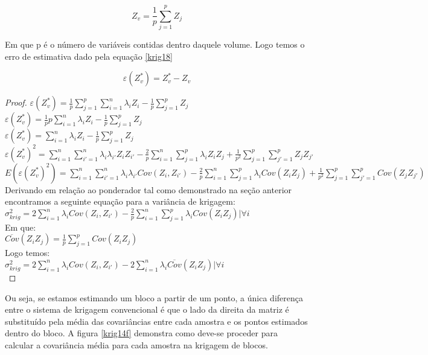 \begin{equation}\label{krig17}
Z_{v}  = \frac{1}{p}\sum_{j=1}^{p} Z_{j}
\end{equation}

Em que p é o número de variáveis contidas dentro daquele volume. Logo temos o erro de estimativa dado pela equação \eqref{krig18}

\begin{equation}\label{krig18}
\varepsilon (Z^{*}_{v}) = Z^{*} _{v} - Z_{v}
\end{equation}

\begin{proof}
	$\varepsilon (Z^{*}_{v}) = \frac{1}{p}\sum_{j=1}^{p}\sum_{i=1}^{n}\lambda_{i}Z_{i} - \frac{1}{p}\sum_{j=1}^{p} Z_{j} $ \\
	$\varepsilon (Z^{*}_{v}) = \frac{1}{p}p\sum_{i=1}^{n}\lambda_{i}Z_{i} - \frac{1}{p}\sum_{j=1}^{p} Z_{j} $\\	
	$\varepsilon (Z^{*}_{v}) = \sum_{i=1}^{n}\lambda_{i}Z_{i} - \frac{1}{p}\sum_{j=1}^{p} Z_{j} $\\	
	$\varepsilon (Z^{*}_{v})^2 = \sum_{i=1}^{n}\sum_{i'=1}^{n}\lambda_{i}\lambda_{i'}Z_{i}Z_{i'} - \frac{2}{p}\sum_{i=1}^{n}\sum_{j=1}^{p}\lambda_{i}Z_{i}Z_{j}+ \frac{1}{p^2}\sum_{j=1}^{p}\sum_{j'=1}^{p} Z_{j}Z_{j'} $\\
	$E\left(\varepsilon (Z^{*}_{v})^2 \right) = \sum_{i=1}^{n}\sum_{i'=1}^{n}\lambda_{i}\lambda_{i'}Cov(Z_{i},Z_{i'}) - \frac{2}{p}\sum_{i=1}^{n}\sum_{j=1}^{p}\lambda_{i}Cov(Z_{i}Z_{j})+ \frac{1}{p^2}\sum_{j=1}^{p}\sum_{j'=1}^{p} Cov(Z_{j}Z_{j'}) $\\   
     Derivando em relação ao ponderador tal como demonstrado na seção anterior encontramos a seguinte equação para a variância de krigagem:    \\
     $\sigma^{2}_{krig} = 2\sum_{i=1}^{n}\lambda_{i}Cov(Z_{i},Z_{i'}) - \frac{2}{p}\sum_{i=1}^{n}\sum_{j=1}^{p}\lambda_{i}Cov(Z_{i}Z_{j}) |\forall i $\\   
     Em que: \\    
     $\overline{Cov}(Z_{i}Z_{j}) = \frac{1}{p}\sum_{j=1}^{p}Cov(Z_{i}Z_{j})$\\
     Logo temos: \\
	 $\sigma^{2}_{krig} = 2\sum_{i=1}^{n}\lambda_{i}Cov(Z_{i},Z_{i'}) - 2\sum_{i=1}^{n}\lambda_{i}\overline{Cov}(Z_{i}Z_{j}) |\forall i $\\ 
\end{proof}

Ou seja, se estamos estimando um bloco a partir de um ponto, a única diferença entre o sistema de krigagem convencional é que o lado da direita da matriz é substituído pela média das covariâncias entre cada amostra e os pontos estimados dentro do bloco. A figura \eqref{krig14f} demonstra como deve-se proceder para calcular a covariância média para cada amostra na krigagem de blocos.

